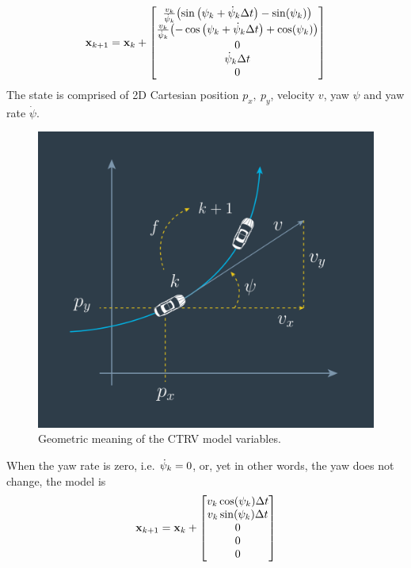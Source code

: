 \documentclass[a4paper,11pt]{article}
\begin{document}
	\begin{equation}
		\stVar_{\tind+1}
		=
		\stVar_\tind + 
		\bmqty{
			\frac{v_\tind}{\dot{\psi}_\tind}\pqty{\sin\pqty\big{\psi_\tind + \dot{\psi}_\tind \Delta t} - \sin(\psi_\tind)} \\
			\frac{v_\tind}{\dot{\psi}_\tind}\pqty{-\cos\pqty\big{\psi_\tind + \dot{\psi}_\tind \Delta t} + \cos(\psi_\tind)} \\
			0 \\
			\dot{\psi}_\tind \Delta t \\
			0
		}
	\end{equation}
	The state is comprised of 2D Cartesian position \( p_x,\ p_y \), velocity \( v \), yaw \( \psi \) and yaw rate \( \dot{\psi} \).
	\begin{figure}[h!]
		\centering
		\includegraphics[scale=0.25]{img/ctrv_model}
		\caption{Geometric meaning of the CTRV model variables.}
		\label{fig:ctrv_model}
	\end{figure}
	When the yaw rate is zero, i.e. \( \dot{\psi}_k = 0 \), or, yet in other words, the yaw does not change, the model is
	\begin{equation}
		\stVar_{\tind+1}
		=
		\stVar_\tind + 
		\bmqty{
			v_\tind\cos(\psi_\tind)\Delta t \\
			v_\tind\sin(\psi_\tind)\Delta t \\
			0 \\
			0 \\
			0
		}
	\end{equation}
\end{document}
